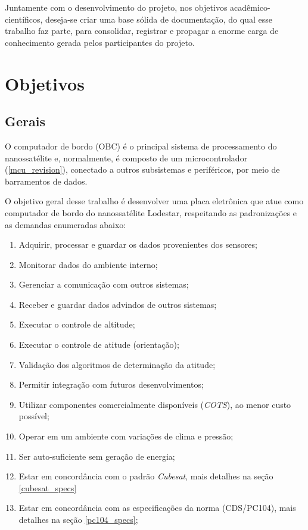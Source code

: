 Juntamente com o desenvolvimento do projeto, nos objetivos acadêmico-científicos, deseja-se criar uma base sólida de documentação, do qual esse trabalho faz parte, para consolidar, registrar e propagar a enorme carga de conhecimento gerada pelos participantes do projeto.

\section{Objetivos}
\subsection{Gerais}\label{gerais}

O computador de bordo (OBC) é o principal sistema de processamento do nanossatélite e, normalmente, é composto de um microcontrolador (\ref{mcu_revision}), conectado a outros subsistemas e periféricos, por meio de barramentos de dados.

O objetivo geral desse trabalho é desenvolver uma placa eletrônica que atue como computador de bordo do nanossatélite Lodestar, respeitando as padronizações e as demandas enumeradas abaixo:

\begin{enumerate}
    \item Adquirir, processar e guardar os dados provenientes dos sensores;
    \item Monitorar dados do ambiente interno;
    \item Gerenciar a comunicação com outros sistemas;
    \item Receber e guardar dados advindos de outros sistemas;
    \item Executar o controle de altitude;
    \item Executar o controle de atitude (orientação);
    \item Validação dos algoritmos de determinação da atitude;
    \item Permitir integração com futuros desenvolvimentos;
    \item Utilizar componentes comercialmente disponíveis (\textit{COTS}), ao menor custo possível;
    \item Operar em um ambiente com variações de clima e pressão;
    \item Ser auto-suficiente sem geração de energia;
    \item Estar em concordância com o padrão \textit{Cubesat}, mais detalhes na seção \ref{cubesat_specs}
    \item Estar em concordância com as especificações da norma (CDS/PC104), mais detalhes na seção \ref{pc104_specs};
\end{enumerate}{}


